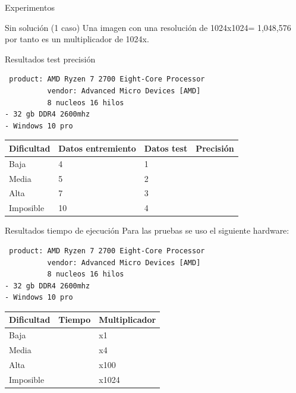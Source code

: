 \documentclass[
  spanish,
  ignorenonframetext,
]{beamer}
\begin{document}
\begin{frame}[fragile]{Experimentos}
\begin{block}{Sin solución (1 caso)}
\protect\hypertarget{sin-soluciuxf3n-1-caso}{}
Una imagen con una resolución de 1024x1024= 1,048,576 por tanto es un
multiplicador de 1024x.
\end{block}

\begin{block}{Resultados test precisión}
\protect\hypertarget{resultados-test-precisiuxf3n}{}
\begin{verbatim}
 product: AMD Ryzen 7 2700 Eight-Core Processor
          vendor: Advanced Micro Devices [AMD]
          8 nucleos 16 hilos
- 32 gb DDR4 2600mhz
- Windows 10 pro
\end{verbatim}

\begin{longtable}[]{@{}llll@{}}
\toprule
Dificultad & Datos entremiento & Datos test & Precisión\tabularnewline
\midrule
\endhead
Baja & 4 & 1 &\tabularnewline
Media & 5 & 2 &\tabularnewline
Alta & 7 & 3 &\tabularnewline
Imposible & 10 & 4 &\tabularnewline
\bottomrule
\end{longtable}
\end{block}

\begin{block}{Resultados tiempo de ejecución}
\protect\hypertarget{resultados-tiempo-de-ejecuciuxf3n}{}
Para las pruebas se uso el siguiente hardware:

\begin{verbatim}
 product: AMD Ryzen 7 2700 Eight-Core Processor
          vendor: Advanced Micro Devices [AMD]
          8 nucleos 16 hilos
- 32 gb DDR4 2600mhz
- Windows 10 pro
\end{verbatim}

\begin{longtable}[]{@{}lll@{}}
\toprule
Dificultad & Tiempo & Multiplicador\tabularnewline
\midrule
\endhead
Baja & & x1\tabularnewline
Media & & x4\tabularnewline
Alta & & x100\tabularnewline
Imposible & & x1024\tabularnewline
\bottomrule
\end{longtable}
\end{block}
\end{frame}
\end{document}
